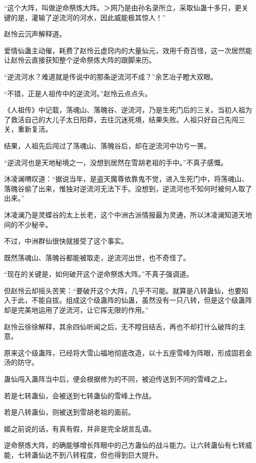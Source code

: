 
\begin{this_body}

“这个大阵，叫做逆命祭炼大阵。＞网乃是由孙名录所立，采取仙蛊十多只，更关键的是，灌输了逆流河的河水，因此威能极其惊人！”

赵怜云沉声解释道。

爱情仙蛊主动催，耗费了赵怜云虚窍内的大量仙元，效用千奇百怪，这一次居然能让赵怜云直接获知整个逆命祭炼大阵的跟脚来历。

“逆流河水？难道就是传说中的那条逆流河不成？”余艺冶子瞪大双眼。

“不错，正是人祖传中的逆流河。”赵怜云点点头。

《人祖传》中记载，荡魂山、落魄谷、逆流河，乃是生死门后的三关。当初人祖为了救活自己的大儿子太日阳莽，去往沉迷死境，结果失败。人祖只好自己先闯三关，重新复活。

结果，人祖先后闯过了荡魂山、落魄谷后，却在逆流河中功亏一篑。

“逆流河也是天地秘境之一，没想到居然在雪胡老祖的手中。”不真子感慨。

沐凌澜喟叹道：“据说当年，是盗天魔尊依靠鬼不觉，进入生死门中，将荡魂山、落魄谷偷了出来，惟独对逆流河无法下手。没想到，逆流河也不知何时被何人取了出来。”

沐凌澜乃是灵蝶谷的太上长老，这个中洲古派情报最为灵通，所以沐凌澜知道天地间的不少秘辛。

不过，中洲群仙很快就接受了这个事实。

既然荡魂山、落魄谷都能被取走，逆流河出世，也不奇怪了。

“现在的关键是，如何破开这个逆命祭炼大阵。”不真子强调道。

但赵怜云却摇头苦笑：“要破开这个大阵，几乎不可能。就算是八转蛊仙，也要陷入于此，不能自拔。组成这个级蛊阵的仙蛊，虽然没有一只八转，但是这个级蛊阵却是完美地运用了逆流河，让它挥无限的作用。”

赵怜云徐徐解释，其余四仙听闻之后，无不瞠目结舌，再也不却打什么破阵的主意。

原来这个级蛊阵，已经将大雪山福地彻底改造，以十五座雪峰为阵眼，形成固若金汤的防守。

蛊仙闯入蛊阵当中后，便会根据修为的不同，被迫传送到不同的雪峰之上。

若是七转蛊仙，会被送到七转蛊仙的雪峰上作战。

若是八转蛊仙，则被送到雪胡老祖的面前。

姬之前说的话，有真有假，并非是完全胡言乱语。

逆命祭炼大阵，的确能够增长阵眼中的己方蛊仙的战斗能力。让六转蛊仙有七转威能，七转蛊仙达不到八转程度，但也得到巨大提升。


\end{this_body}
